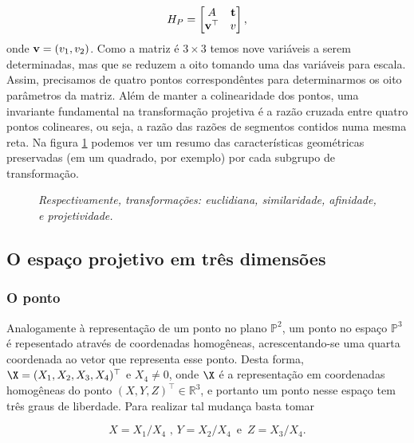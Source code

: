 \begin{equation*}
H_P=
\begin{bmatrix}
A&{\bf t}\\
{\bf v}^\top&v
\end{bmatrix},
\end{equation*}
onde ${\bf v}=(v_1,v_2)$. Como a matriz é $3\times3$ temos nove variáveis a serem determinadas, mas que se reduzem a oito tomando uma das variáveis para escala. Assim, precisamos de quatro pontos correspondêntes para determinarmos os oito parâmetros da matriz. Além de manter a colinearidade dos pontos, uma invariante fundamental na transformação projetiva é a razão cruzada entre quatro pontos colineares, ou seja, a razão das razões de segmentos contidos numa mesma reta. Na figura \ref{fig.transformacoes-2D} podemos ver um resumo das características geométricas preservadas (em um quadrado, por exemplo) por cada subgrupo de transformação.   

\begin{figure}[!htb]
\centering
{}
\qquad
{}
\qquad
{}
\qquad
{}
\caption{\textit{Respectivamente, transformações: euclidiana, similaridade, afinidade, e projetividade.}}
\label{fig.transformacoes-2D}
\end{figure}

\subsection{O espaço projetivo em três dimensões}\label{sec.espaco-P3}


\subsubsection{O ponto} 


Analogamente à representação de um ponto no plano $\mathbb{P}^2$, um ponto no espaço $\mathbb{P}^3$ é repesentado através de coordenadas homogêneas, acrescentando-se uma quarta coordenada ao vetor que representa esse ponto. Desta forma, $\X = (X_1,X_2,X_3,X_4)^\top$ e $X_4 \ne 0$, onde $\X$ é a representação em coordenadas homogêneas do ponto $(X,Y,Z)^\top \in \mathbb{R}^3$, e portanto um ponto nesse espaço tem três graus de liberdade. Para realizar tal mudança basta tomar 

\begin{equation*}
X=X_1/X_4 \,\, ,\, Y=X_2/X_4 \,\,\, \text{e} \,\,\, Z=X_3/X_4.
\end{equation*}

